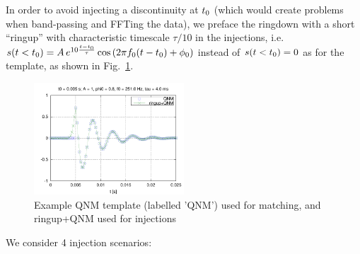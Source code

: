 \documentclass[aps,prd,onecolumn,notitlepage,nofootinbib,superscriptaddress,altaffilletter,floatfix]{revtex4-1}
\begin{document}
In order to avoid injecting a discontinuity at $t_0$ (which would create problems when band-passing and FFTing the data), we preface the ringdown
with a short ``ringup'' with characteristic timescale $\tau/10$ in the injections, i.e.\
$s(t<t_0) = A\,e^{10\frac{t-t_0}{\tau}}\cos\left(2\pi f_0 (t-t_0) + \phi_0\right)$ instead of $s(t<t_0)=0$ as for the template, as
shown in Fig.~\ref{fig:QNMtemplate}.
\begin{figure}[htbp]
  \centering
  \includegraphics[width=0.5\textwidth]{QNMtemplate.pdf}
  \caption{Example QNM template (labelled 'QNM') used for matching, and ringup+QNM used for injections}
  \label{fig:QNMtemplate}
\end{figure}
We consider 4 injection scenarios:
\end{document}
